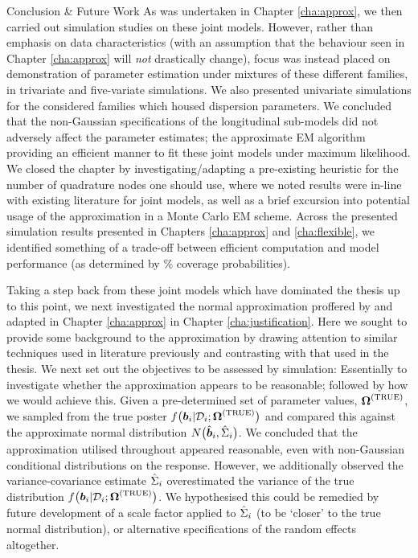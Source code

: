 \begin{chapter}{\label{cha:conclusion}Conclusion \& Future Work}
As was undertaken in Chapter \ref{cha:approx}, we then carried out simulation studies on these joint models. However, rather than emphasis on data characteristics (with an assumption that the behaviour seen in Chapter \ref{cha:approx} will \textit{not} drastically change), focus was instead placed on demonstration of parameter estimation under mixtures of these different families, in trivariate and five-variate simulations. We also presented univariate simulations for the considered families which housed dispersion parameters. We concluded that the non-Gaussian specifications of the longitudinal sub-models did not adversely affect the parameter estimates; the approximate EM algorithm providing an efficient manner to fit these joint models under maximum likelihood. We closed the chapter by investigating/adapting a pre-existing heuristic for the number of quadrature nodes one should use, where we noted results were in-line with existing literature for joint models, as well as a brief excursion into potential usage of the approximation in a Monte Carlo EM scheme. Across the presented simulation results presented in Chapters \ref{cha:approx} and \ref{cha:flexible}, we identified something of a trade-off between efficient computation and model performance (as determined by \% coverage probabilities).

Taking a step back from these joint models which have dominated the thesis up to this point, we next investigated the normal approximation proffered by \citet{Bernhardt15} and adapted in Chapter \ref{cha:approx} in Chapter \ref{cha:justification}. Here we sought to provide some background to the approximation by drawing attention to similar techniques used in literature previously \citep{Rizopoulos2012} and contrasting with that used in the thesis. We next set out the objectives to be assessed by simulation: Essentially to investigate whether the approximation appears to be reasonable; followed by how we would achieve this. Given a pre-determined set of parameter values, $\bm{\mathrm{\Omega}}^{(\mathrm{TRUE})}$, we sampled from the true poster $f\big(\bm{b}_i|\mathcal{D}_i;\bm{\mathrm{\Omega}}^{(\mathrm{TRUE})}\big)$ and compared this against the approximate normal distribution $N\big(\hat{\bm{b}}_i,\hat{\Sigma}_i\big)$. We concluded that the approximation utilised throughout appeared reasonable, even with non-Gaussian conditional distributions on the response. However, we additionally observed the variance-covariance estimate $\hat{\Sigma}_i$ overestimated the variance of the true distribution $f\big(\bm{b}_i|\mathcal{D}_i;\bm{\mathrm{\Omega}}^{(\mathrm{TRUE})}\big)$. We hypothesised this could be remedied by future development of a scale factor applied to $\hat{\Sigma}_i$ (\ie to be `closer' to the true normal distribution), or alternative specifications of the random effects altogether.


\end{chapter}
